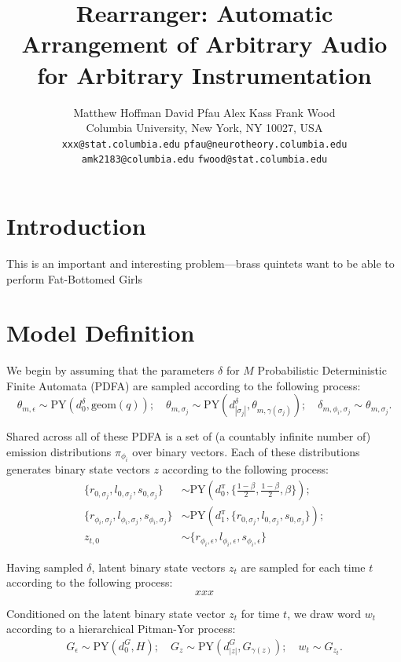 \documentclass{article}
\title{Rearranger: Automatic Arrangement of Arbitrary Audio for
  Arbitrary Instrumentation}
\author{
Matthew Hoffman \hspace{1cm} David Pfau \hspace{1cm} Alex Kass \hspace{1cm} Frank Wood \\
Columbia University, New York, NY 10027, USA \\
\texttt{xxx@stat.columbia.edu}
\texttt{pfau@neurotheory.columbia.edu} 
\texttt{amk2183@columbia.edu}
\texttt{fwood@stat.columbia.edu}
}
\newcommand{\PY}{\textrm{PY}}
\newcommand{\geom}{\textrm{geom}}
\begin{document}
\maketitle

\section{Introduction}

This is an important and interesting problem---brass quintets want to be
able to perform Fat-Bottomed Girls

\section{Model Definition}

We begin by assuming that the parameters $\delta$ for $M$
Probabilistic Deterministic Finite Automata (PDFA) are sampled
according to the following process:
\begin{equation}
\theta_{m,\epsilon} \sim \PY(d^{\delta}_{0},\geom(q)); \quad
\theta_{m,\sigma_j} \sim \PY(d^{\delta}_{|\sigma_j|},
\theta_{m,\gamma(\sigma_j)}); \quad
\delta_{m,\phi_i,\sigma_j} \sim \theta_{m,\sigma_j}.
\end{equation}

Shared across all of these PDFA is a set of (a countably infinite
number of) emission distributions $\pi_{\phi_i}$ over binary
vectors. Each of these distributions generates binary state vectors
$z$ according to the following process:
\begin{equation}
\begin{split}
\{r_{0,\sigma_j}, l_{0,\sigma_j}, s_{0,\sigma_j}\} &\sim \PY(d^\pi_{0}, 
\{\frac{1-\beta}{2}, \frac{1-\beta}{2}, \beta\}); \\
\{r_{\phi_i,\sigma_j}, l_{\phi_i,\sigma_j}, s_{\phi_i,\sigma_j}\} &\sim \PY(d^\pi_{1}, 
\{r_{0,\sigma_j}, l_{0,\sigma_j}, s_{0,\sigma_j}\}); \\
z_{t,0} &\sim \{r_{\phi_i, \epsilon}, l_{\phi_i, \epsilon}, 
s_{\phi_i, \epsilon}\}
\end{split}
\end{equation}

Having sampled $\delta$, latent binary state vectors $z_t$ are sampled
for each time $t$ according to the following process:
\begin{equation}
xxx
\end{equation}

Conditioned on the latent binary state vector $z_t$ for time $t$, we
draw word $w_t$ according to a hierarchical Pitman-Yor process:
\begin{equation}
\begin{split}
G_{\epsilon} \sim \PY(d^G_{0},H); \quad
G_z \sim \PY(d^G_{|z|},G_{\gamma(z)}); \quad
w_t \sim G_{z_t}.
\end{split}
\end{equation}
\end{document}

